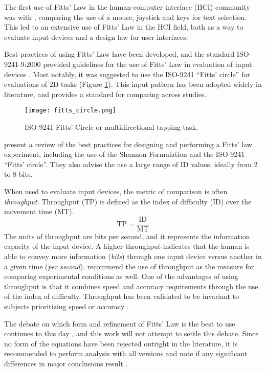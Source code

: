 The first use of Fitts' Law in the human-computer interface (HCI) community was with \citet{card_evaluation_1978}, comparing the use of a mouse, joystick and keys for text selection.
This led to an extensive use of Fitts' Law in the HCI field, both as a way to evaluate input devices and a design law for user interfaces.

Best practices of using Fitts' Law have been developed, and the standard ISO-9241-9:2000 provided guidelines for the use of Fitts' Law in evaluation of input devices \citep{international_organization_for_standardization_iso_2000}.
Most notably, it was suggested to use the ISO-9241 ``Fitts' circle'' for evaluations of 2D tasks (Figure \ref{fig:intro_fitts_circle}).
This input pattern has been adopted widely in literature, and provides a standard for comparing across studies.

\begin{figure}
    \centering
    \texttt{[image: fitts\_circle.png]}
    \caption{ISO-9241 Fitts' Circle or multidirectional tapping task.}
    \label{fig:intro_fitts_circle}
\end{figure}

\citet{soukoreff_towards_2004} present a review of the best practices for designing and performing a Fitts' law experiment, including the use of the Shannon Formulation and the ISO-9241 ``Fitts' circle''.
They also advise the use a large range of ID values, ideally from 2 to 8 bits.

When used to evaluate input devices, the metric of comparison is often \emph{throughput}.
Throughput (TP) is defined as the index of difficulty (ID) over the movement time (MT).
\begin{equation}
    \mathrm{TP} = \frac{\text{ID}}{\text{MT}}
\end{equation}
The units of throughput are bits per second, and it represents the information capacity of the input device.
A higher throughput indicates that the human is able to convey more information (\emph{bits}) through one input device versus another in a given time (\emph{per second}).
\citet{soukoreff_towards_2004} recommend the use of throughput as the measure for comparing experimental conditions as well.
One of the advantages of using throughput is that it combines speed and accuracy requirements through the use of the index of difficulty.
Throughput has been validated to be invariant to subjects prioritizing speed or accuracy \citep{mackenzie_fitts_2008}.

The debate on which form and refinement of Fitts' Law is the best to use continues to this day \citep{drewes_only_2010,hoffmann_which_2013}, and this work will not attempt to settle this debate.
Since no form of the equations have been rejected outright in the literature, it is recommended to perform analysis with all versions and note if any significant differences in major conclusions result \citep{soukoreff_towards_2004}.

